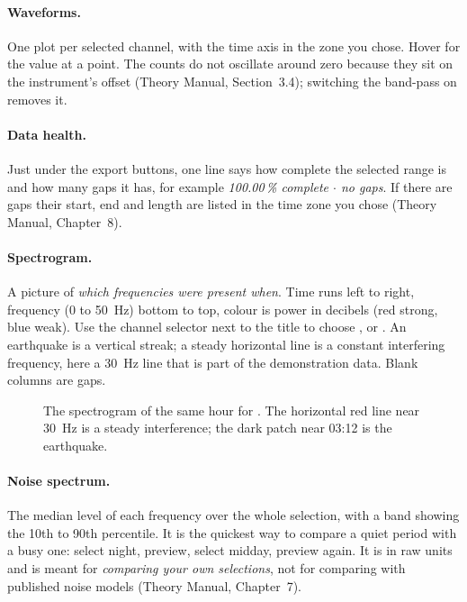 \paragraph{Waveforms.} One plot per selected channel, with the time axis in the zone you chose. Hover for the value at a point. The
counts do not oscillate around zero because they sit on the instrument's offset (Theory Manual, Section~3.4); switching the
band-pass on removes it.

\paragraph{Data health.} Just under the export buttons, one line says how complete the selected range is and how many gaps it has,
for example \emph{100.00\,\% complete $\cdot$ no gaps}. If there are gaps their start, end and length are listed in the time
zone you chose (Theory Manual, Chapter~8).

\paragraph{Spectrogram.} A picture of \emph{which frequencies were present when}. Time runs left to right, frequency (0 to 50~Hz)
bottom to top, colour is power in decibels (red strong, blue weak). Use the channel selector next to the title to choose
,  or . An earthquake is a vertical streak; a steady horizontal line is a constant interfering
frequency, here a 30~Hz line that is part of the demonstration data. Blank columns are gaps.

\begin{figure}[tbp]
\centering
{}
\caption{The spectrogram of the same hour for . The horizontal red line near 30~Hz is a steady interference; the dark
patch near 03:12 is the earthquake.}
\end{figure}

\paragraph{Noise spectrum.} The median level of each frequency over the whole selection, with a band showing the 10th to 90th
percentile. It is the quickest way to compare a quiet period with a busy one: select night, preview, select midday, preview again.
It is in raw units and is meant for \emph{comparing your own selections}, not for comparing with published noise models
(Theory Manual, Chapter~7).

